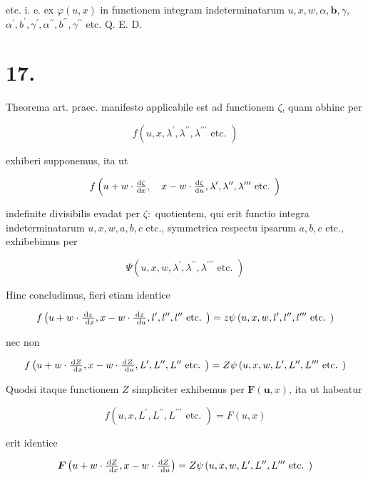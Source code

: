 \documentclass[twoside,12pt, showframe]{memoir}
\let\oldfrac\frac
\def\frac#1#2{\mathchoice{\tfrac{#1}{#2}}{\oldfrac{#1}{#2}}{\genfrac{}{}{}{2}{#1}{#2\mathstrut}}{\genfrac{}{}{}{3}{#1}{#2\mathstrut}}}
\begin{document}
etc. i. e. ex \(\varphi(u, x)\) in functionem integram indeterminatarum \(u, x, w, \alpha, \boldsymbol{b}, \gamma\), \(\alpha^{\prime}, b^{\prime}, \gamma^{\prime}, \alpha^{\prime \prime}, b^{\prime \prime}, \gamma^{\prime \prime}\) etc. Q. E. D.

\section*{17.}
Theorema art. praec. manifesto applicabile est ad functionem \(\zeta\), quam abhinc per

\[
f\left(u, x, \lambda^{\prime}, \lambda^{\prime \prime}, \lambda^{\prime \prime \prime} \text { etc. }\right)
\]

exhiberi supponemus, ita ut

\[
f\left(u+w \cdot \frac{\mathrm{d} \zeta}{\mathrm{d} x}, \quad x-w \cdot \frac{\mathrm{d} \zeta}{\mathrm{d} u}, \lambda^{\prime}, \lambda^{\prime \prime}, \lambda^{\prime \prime \prime} \text { etc. }\right)
\]

indefinite divisibilis evadat per \(\zeta:\) quotientem, qui erit functio integra indeterminatarum \(u, x, w, a, b, c\) etc., symmetrica respectu ipsarum \(a, b, c\) etc., exhibebimus per

\[
\Psi\left(u, x, w, \lambda^{\prime}, \lambda^{\prime \prime}, \lambda^{\prime \prime \prime} \text { etc. }\right)
\]

Hinc concludimus, fieri etiam identice

\[
f\left(u+w \cdot \frac{\mathrm{d} z}{\mathrm{~d} x}, x-w \cdot \frac{\mathrm{d} z}{\mathrm{~d} u}, l^{\prime}, l^{\prime \prime}, l^{\prime \prime} \text { etc. }\right)=z \psi\left(u, x, w, l^{\prime}, l^{\prime \prime}, l^{\prime \prime \prime} \text { etc. }\right)
\]

nec non

\[
f\left(u+w \cdot \frac{\mathrm{d} Z}{\mathrm{~d} x}, x-w \cdot \frac{\mathrm{d} Z}{\mathrm{~d} u}, L^{\prime}, L^{\prime \prime}, L^{\prime \prime} \text { etc. }\right)=Z \psi\left(u, x, w, L^{\prime}, L^{\prime \prime}, L^{\prime \prime \prime} \text { etc. }\right)
\]

Quodsi itaque functionem \(Z\) simpliciter exhibemus per \(\boldsymbol{F}(\boldsymbol{u}, x)\), ita ut habeatur

\[
f\left(u, x, L^{\prime}, L^{\prime \prime}, L^{\prime \prime \prime} \text { etc. }\right)=F(u, x)
\]

erit identice

\[
\boldsymbol{F}\left(u+w \cdot \frac{\mathrm{d} Z}{\mathrm{~d} x}, x-w \cdot \frac{\mathrm{d} Z}{\mathrm{~d} u}\right)=Z \psi\left(u, x, w, L^{\prime}, L^{\prime \prime}, L^{\prime \prime \prime} \text { etc. }\right)
\]
\end{document}
